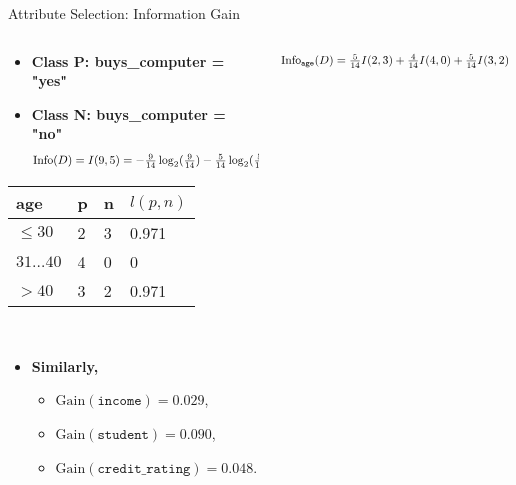 \begin{frame}{Attribute Selection: Information Gain}
	\begin{columns}
		\begin{column}{0.45\textwidth}
			\begin{itemize}
				\item \textbf{Class P: buys\_computer = "yes"}
				\item \textbf{Class N: buys\_computer = "no"}
				      \begin{align*}
					      \resizebox{7cm}{!}{%
						      $\text{Info}(D) = I(9,5) = - \frac{9}{14}\log_2(\frac{9}{14})-\frac{5}{14} \log_2(\frac{5}{14}) = 0.94$
					      }
				      \end{align*}
			\end{itemize}
			\centering
			\begin{tabular}{|l|l|l|l|}
				\hline
				\cellcolor{blue!20}age            & \cellcolor{blue!20}p & \cellcolor{blue!20}n & \cellcolor{blue!20}$l(p,n)$ \\\hline
				\cellcolor{yellow!20}$\leq 30$    & 2                    & 3                    & 0.971                       \\\hline
				\cellcolor{yellow!20}$31\ldots40$ & 4                    & 0                    & 0                           \\\hline
				\cellcolor{yellow!20}$>40$        & 3                    & 2                    & 0.971                       \\\hline
			\end{tabular}\\[0.2cm]
			\begin{itemize}
				\item \textbf{Similarly,}
				      \begin{itemize}
					      \item $\text{Gain}(\texttt{income}) = 0.029$,
					      \item $\text{Gain}(\texttt{student}) = 0.090$,
					      \item $\text{Gain}(\texttt{credit\_rating}) = 0.048$.
				      \end{itemize}
			\end{itemize}
		\end{column}
		\begin{column}{0.45\textwidth}
			\vspace{-1.3cm}
			\begin{align*}
				\resizebox{7cm}{!}{%
				$\text{Info}_{\texttt{age}}(D) = \frac{5}{14}I(2,3) + \frac{4}{14} I(4,0) + \frac{5}{14} I(3,2) = 0.694$.
}
\end{align*}
\end{column}
\end{columns}
\end{frame}

